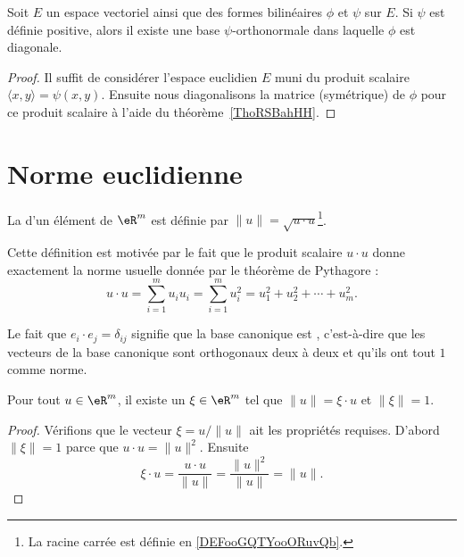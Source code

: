 \begin{corollary}   \label{CorSMHpoVK}
	Soit \( E\) un espace vectoriel ainsi que des formes bilinéaires \( \phi\) et \( \psi\) sur \( E\). Si \( \psi\) est définie positive, alors il existe une base \( \psi\)-orthonormale dans laquelle \( \phi\) est diagonale.
\end{corollary}

\begin{proof}
	Il suffit de considérer l'espace euclidien \( E\) muni du produit scalaire \( \langle x, y\rangle =\psi(x,y)\). Ensuite nous diagonalisons la matrice (symétrique) de \( \phi\) pour ce produit scalaire à l'aide du théorème~\ref{ThoRSBahHH}.
\end{proof}


\section{Norme euclidienne}


\begin{definition}      \label{DefNormeEucleApp}
	La  d'un élément de \( \eR^m\) est définie par \( \| u \|=\sqrt{u\cdot u}\)\footnote{La racine carrée est définie en \ref{DEFooGQTYooORuvQb}.}.
\end{definition}

Cette définition est motivée par le fait que le produit scalaire \( u\cdot u\) donne exactement la norme usuelle donnée par le théorème de Pythagore :
\begin{equation}
	u\cdot u=\sum_{i=1}^mu_iu_i=\sum_{i=1}^m u_i^2=u_1^2+u_2^2+\cdots+u_m^2.
\end{equation}

Le fait que \( e_i\cdot e_j=\delta_{ij}\) signifie que la base canonique est , c'est-à-dire que les vecteurs de la base canonique sont orthogonaux deux à deux et qu'ils ont tout \( 1\) comme norme.

\begin{lemma}\label{LemSclNormeXi}
	Pour tout \( u\in\eR^m\), il existe un \( \xi\in\eR^m\) tel que \( \| u \|=\xi\cdot u\) et \( \| \xi \|=1\).
\end{lemma}

\begin{proof}
	Vérifions que le vecteur \( \xi=u/\| u \|\) ait les propriétés requises. D'abord \( \| \xi \|=1\) parce que \( u\cdot u=\| u \|^2\). Ensuite
	\begin{equation}
		\xi\cdot u=\frac{ u\cdot u }{ \| u \| }=\frac{ \| u \|^2 }{ \| u \| }=\| u \|.
	\end{equation}
\end{proof}

